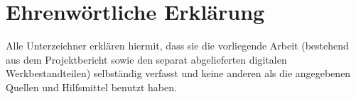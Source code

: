 \documentclass[a4paper,11pt,twoside]{article}
\begin{document}
\cleardoublepage


\cleardoublepage


\cleardoublepage



\cleardoublepage
\fancyhead[RE,LO]{}


\cleardoublepage


\cleardoublepage
{}
{}

\section*{Ehrenwörtliche Erklärung}
\label{sec:erklaerung}
Alle Unterzeichner erklären hiermit, dass sie die vorliegende Arbeit
(bestehend aus dem Projektbericht sowie den separat abgelieferten
digitalen Werkbestandteilen) selbständig verfasst und keine anderen als
die angegebenen Quellen und Hilfsmittel benutzt haben.





	\newpage


\end{document}
